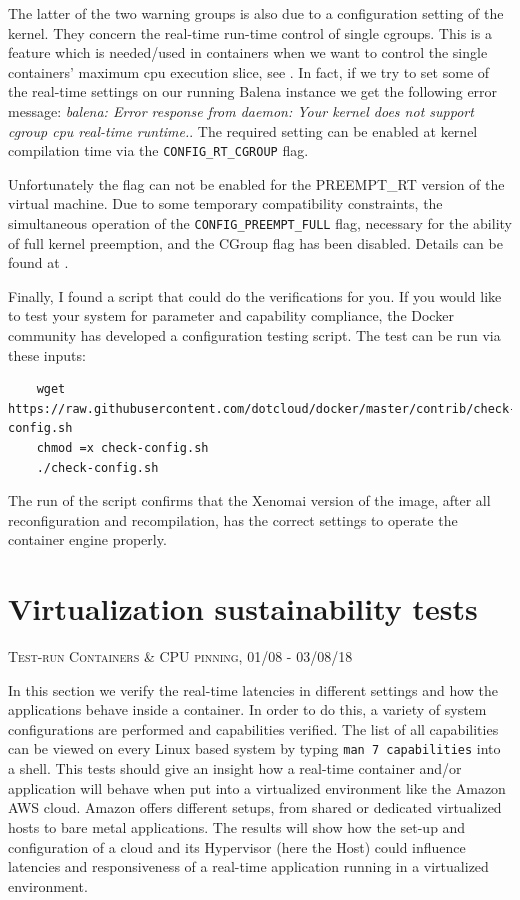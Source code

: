 \documentclass[]{scrartcl}
\begin{document}
The latter of the two warning groups is also due to a configuration setting of the kernel. They concern the real-time run-time control of single cgroups. This is a feature which is needed/used in containers when we want to control the single containers' maximum cpu execution slice, see \cite{docker04}. 
In fact, if we try to set some of the real-time settings on our running Balena instance we get the following error message: \textit{balena: Error response from daemon: Your kernel does not support cgroup cpu real-time runtime.}.
The required setting can be enabled at kernel compilation time via the \texttt{CONFIG\_RT\_CGROUP} flag. 

Unfortunately the flag can not be enabled for the PREEMPT\_RT version of the virtual machine. Due to some temporary compatibility constraints, the simultaneous operation of the \texttt{CONFIG\_PREEMPT\_FULL} flag, necessary for the ability of full kernel preemption, and the CGroup flag has been disabled. Details can be found at \cite{lfnd01}.

Finally, I found a script that could do the verifications for you. If you would like to test your system for parameter and capability compliance, the Docker community has developed a configuration testing script. The test can be run via these inputs:

\begin{verbatim}
	wget https://raw.githubusercontent.com/dotcloud/docker/master/contrib/check-config.sh
	chmod =x check-config.sh
	./check-config.sh
\end{verbatim}

The run of the script confirms that the Xenomai version of the image, after all reconfiguration and recompilation, has the correct settings to operate the container engine properly.

\section{Virtualization sustainability tests}
\label{sec:virtsust}
{\small\textsc{Test-run Containers \& CPU pinning, 01/08 - 03/08/18} \bigskip}

In this section we verify the real-time latencies in different settings and how the applications behave inside a container. In order to do this, a variety of system configurations are performed and capabilities verified. The list of all capabilities can be viewed on every Linux based system by typing \texttt{man 7 capabilities} into a shell. This tests should give an insight how a real-time container and/or application will behave when put into a virtualized environment like the Amazon AWS cloud. Amazon offers different setups, from shared or dedicated virtualized hosts to bare metal applications. The results will show how the set-up and configuration of a cloud and its  Hypervisor (here the Host) could influence latencies and responsiveness of a real-time application running in a virtualized environment.
\end{document}
